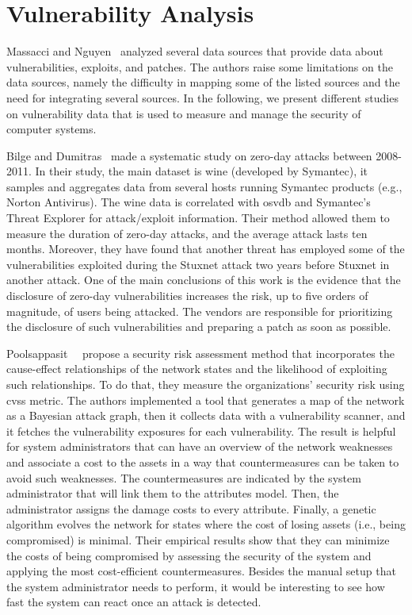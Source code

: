 \section{Vulnerability Analysis}
Massacci and Nguyen~\cite{Massacci:2010} analyzed several data sources that provide data about vulnerabilities, exploits, and patches. 
The authors raise some limitations on the data sources, namely the difficulty in mapping some of the listed sources and the need for integrating several sources.
In the following, we present different studies on vulnerability data that is used to measure and manage the security of computer systems.

Bilge and Dumitras~\cite{Bilge:2012} made a systematic study on zero-day attacks between 2008-2011.
In their study, the main dataset is \gls{wine} (developed by Symantec), it samples and aggregates data from several hosts running Symantec products (e.g., Norton Antivirus).
The \gls{wine} data is correlated with \gls{osvdb} and Symantec's Threat Explorer for attack/exploit information.
Their method allowed them to measure the duration of zero-day attacks, and the average attack lasts ten months. 
Moreover, they have found that another threat has employed some of the vulnerabilities exploited during the Stuxnet attack two years before Stuxnet in another attack.
One of the main conclusions of this work is the evidence that the disclosure of zero-day vulnerabilities increases the risk, up to five orders of magnitude, of users being attacked.
The vendors are responsible for prioritizing the disclosure of such vulnerabilities and preparing a patch as soon as possible. 


Poolsappasit~\etal{}~\cite{Poolsappasit:2012} propose a security risk assessment method that incorporates the cause-effect relationships of the network states and the likelihood of exploiting such relationships.
To do that, they measure the organizations' security risk using \gls{cvss} metric.
The authors implemented a tool that generates a map of the network as a Bayesian attack graph, then it collects data with a vulnerability scanner, and it fetches the vulnerability exposures for each vulnerability.
The result is helpful for system administrators that can have an overview of the network weaknesses and associate a cost to the assets in a way that countermeasures can be taken to avoid such weaknesses.
The countermeasures are indicated by the system administrator that will link them to the attributes model.
Then, the administrator assigns the damage costs to every attribute.
Finally, a genetic algorithm evolves the network for states where the cost of losing assets (i.e., being compromised) is minimal. 
Their empirical results show that they can minimize the costs of being compromised by assessing the security of the system and applying the most cost-efficient countermeasures.
Besides the manual setup that the system administrator needs to perform, it would be interesting to see how fast the system can react once an attack is detected.



